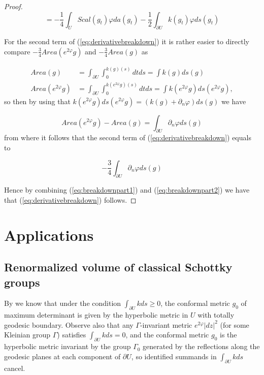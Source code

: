 \documentclass[12pt]{amsart}
\begin{document}
\begin{proof}
\begin{equation}\label{eq:breakdownpart1}
= -\frac14\int_U  Scal(g_t)\varphi da(g_t) -\frac12\int_{\partial U} k(g_t)\varphi ds(g_t)
\end{equation}

For the second term of (\ref{eq:derivativebreakdown}) it is rather easier to directly compare $-\frac34 Area(e^{2\varphi}g)$ and $-\frac34 Area(g)$ as

\begin{align*}
    Area(g) &= \int_{\partial U}\int_0^{k(g)(s)}dtds = \int k(g)ds(g)\\
    Area(e^{2\varphi}g) &= \int_{\partial U}\int_0^{k(e^{2\varphi}g)(s)}dtds = \int k(e^{2\varphi}g)ds(e^{2\varphi}g),
\end{align*}
so then by using that $k(e^{2\varphi}g)ds(e^{2\varphi}g) = (k(g) + \partial_n\varphi)ds(g)$ we have

\[
Area(e^{2\varphi}g) - Area(g) =  \int_{\partial U} \partial_n\varphi ds(g)
\]
from where it follows that the second term of (\ref{eq:derivativebreakdown}) equals to

\begin{equation}\label{eq:breakdownpart2}
-\frac34\int_{\partial U} \partial_n\varphi ds(g)
\end{equation}

Hence by combining (\ref{eq:breakdownpart1}) and (\ref{eq:breakdownpart2}) we have that (\ref{eq:derivativebreakdown}) follows.

\end{proof}




\section{Applications}\label{sec:applications}

\subsection{Renormalized volume of classical Schottky groups}\label{subsec:negVR}

By \cite[Theorem 1]{OsgoodPhillipsSarnak} we know that under the condition $\int_{\partial U} kds\geq 0$, the conformal metric $g_0$ of maximum determinant is given by the hyperbolic metric in $U$ with totally geodesic boundary. Observe also that any $\Gamma$-invariant metric $e^{2\varphi}|dz|^2$ (for some Kleinian group $\Gamma$) satisfies $\int_{\partial U} kds = 0$, and the conformal metric $g_0$ is the hyperbolic metric invariant by the group $\Gamma_0$ generated by the reflections along the geodesic planes at each component of $\partial U$, so identified summands in $\int_{\partial U} kds$ cancel.
\end{document}
